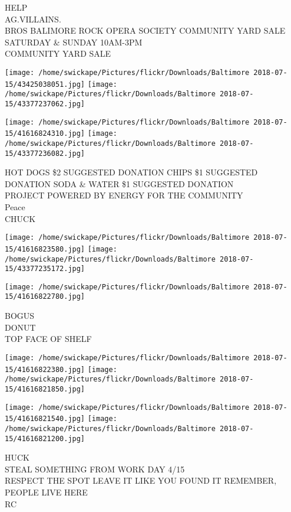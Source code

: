 \documentclass[10pt,letterpaper]{article}
\begin{document}
HELP\\
AG.VILLAINS.\\
BROS BALIMORE ROCK OPERA SOCIETY COMMUNITY YARD SALE SATURDAY \& SUNDAY 10AM{-}3PM\\
COMMUNITY YARD SALE
\pagebreak

\texttt{[image: /home/swickape/Pictures/flickr/Downloads/Baltimore 2018-07-15/43425038051.jpg]}
\texttt{[image: /home/swickape/Pictures/flickr/Downloads/Baltimore 2018-07-15/43377237062.jpg]}

\texttt{[image: /home/swickape/Pictures/flickr/Downloads/Baltimore 2018-07-15/41616824310.jpg]}
\texttt{[image: /home/swickape/Pictures/flickr/Downloads/Baltimore 2018-07-15/43377236082.jpg]}

HOT DOGS \$2 SUGGESTED DONATION CHIPS \$1 SUGGESTED DONATION SODA \& WATER \$1 SUGGESTED DONATION\\
PROJECT POWERED BY ENERGY FOR THE COMMUNITY\\
Peace\\
CHUCK
\pagebreak

\texttt{[image: /home/swickape/Pictures/flickr/Downloads/Baltimore 2018-07-15/41616823580.jpg]}
\texttt{[image: /home/swickape/Pictures/flickr/Downloads/Baltimore 2018-07-15/43377235172.jpg]}

\vspace{0.25in}
\texttt{[image: /home/swickape/Pictures/flickr/Downloads/Baltimore 2018-07-15/41616822780.jpg]}

BOGUS\\
DONUT\\
TOP FACE OF SHELF
\pagebreak

\texttt{[image: /home/swickape/Pictures/flickr/Downloads/Baltimore 2018-07-15/41616822380.jpg]}
\texttt{[image: /home/swickape/Pictures/flickr/Downloads/Baltimore 2018-07-15/41616821850.jpg]}

\texttt{[image: /home/swickape/Pictures/flickr/Downloads/Baltimore 2018-07-15/41616821540.jpg]}
\texttt{[image: /home/swickape/Pictures/flickr/Downloads/Baltimore 2018-07-15/41616821200.jpg]}

HUCK\\
STEAL SOMETHING FROM WORK DAY 4/15\\
RESPECT THE SPOT LEAVE IT LIKE YOU FOUND IT REMEMBER, PEOPLE LIVE HERE\\
RC
\pagebreak
\end{document}
